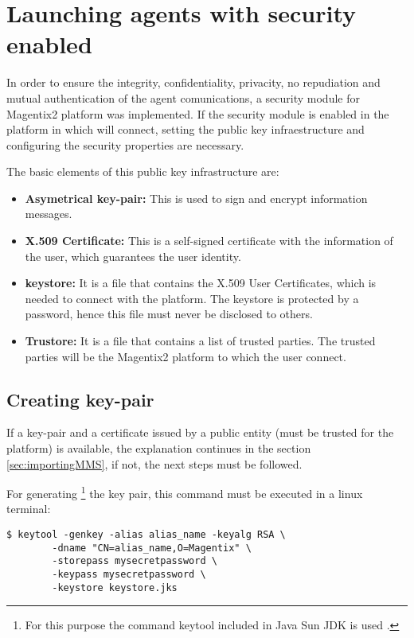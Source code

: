 \section{Launching agents with security enabled}
\label{sec:securityenable}


In order to ensure the integrity, confidentiality, privacity, no repudiation and mutual authentication of the agent comunications, a security module for Magentix2 platform was implemented. 
If the security module is enabled in the platform in which will connect, setting the public key infraestructure and configuring the security properties are necessary.

The basic elements of this public key infrastructure are:

\begin{itemize}

\item \textbf{Asymetrical key-pair:} This is used to sign and encrypt information messages.
\item \textbf{X.509 Certificate:} This is a self-signed certificate with the information of the user, which guarantees the user identity.
\item \textbf{keystore:} It is a file that contains the X.509 User Certificates, which is needed to connect with the platform. The keystore is protected by a password, 
hence this file must never be disclosed to others.
\item \textbf{Trustore:} It is a file that contains a list of trusted parties. The trusted parties will be the Magentix2 platform to which the user connect.
\end{itemize}



\subsection{Creating key-pair}

If a key-pair and a certificate issued by a public entity (must be trusted for the platform) is available, the explanation continues in the section \ref{sec:importingMMS}, if not, the next steps must be followed.

For generating \footnote{For this purpose the command keytool included in Java Sun JDK is used
.} the key pair, this command must be executed in a linux terminal:
\begin{verbatim}
$ keytool -genkey -alias alias_name -keyalg RSA \
		-dname "CN=alias_name,O=Magentix" \
		-storepass mysecretpassword \
		-keypass mysecretpassword \
		-keystore keystore.jks
\end{verbatim}

